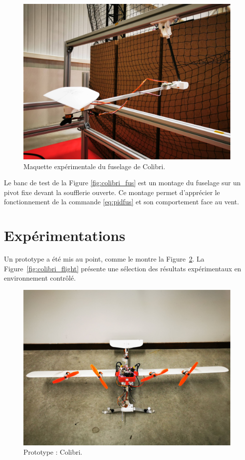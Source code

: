 \begin{figure}[ht!]
    \centering
    \includegraphics[trim={0 15cm 0 25cm},clip, width=0.7\columnwidth]{figures/IMG_20230120_141852.jpg}
    \caption{Maquette expérimentale du fuselage de Colibri.}
    \label{fig:colibri_fus}
\end{figure}

Le banc de test de la Figure \eqref{fig:colibri_fus} est un montage du fuselage sur un pivot fixe devant la soufflerie ouverte. Ce montage permet d'apprécier le fonctionnement de la commande \eqref{eq:pidfus} et son comportement face au vent.




\section{Expérimentations}
\label{sec:exp}
Un prototype a été mis au point, comme le montre la Figure~\ref{fig:colibri_real}. La Figure~\ref{fig:colibri_flight} présente une sélection des résultats expérimentaux en environnement contrôlé.


\begin{figure}[ht!]
    \centering
    \includegraphics[trim={0 15cm 0 25cm},clip, width=0.6\columnwidth]{figures/colibri_real.jpg}
    \caption{Prototype : Colibri.}
    \label{fig:colibri_real}
\end{figure}

